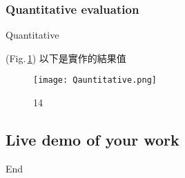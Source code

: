 \documentclass{beamer}
\begin{document}
\subsubsection{Quantitative evaluation}
\begin{frame}{Quantitative}

\begin{CJK}{UTF8}{bkai}
(Fig.\,\ref{fig:14})  
以下是實作的結果值
 \end{CJK}
 \begin{figure}
    \texttt{[image: Qauntitative.png]}
    \caption{14}
    \label{fig:14}
  \end{figure}


\end{frame}

\subsection{Live demo of your work}

\begin{frame}
\center \huge End
\end{frame}
\end{document}
